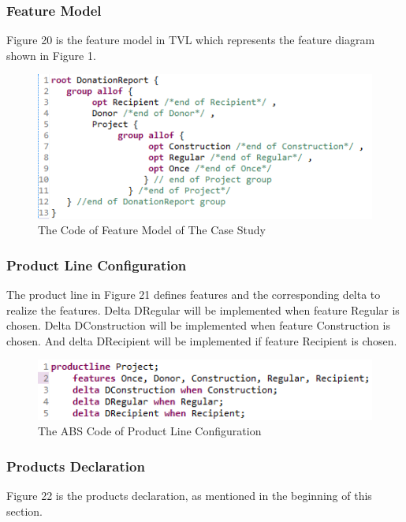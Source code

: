 \documentclass[runningheads,a4paper]{llncs}
\begin{document}
\subsubsection{Feature Model}
Figure 20 is the feature model in \textmu TVL which represents the feature diagram shown in Figure 1.

\begin{figure}
	\centering
	\includegraphics[scale=0.7]{code6.png}
	\caption{The Code of Feature Model of The Case Study}
	\label{Figure 20}
\end{figure}

\subsubsection{Product Line Configuration}
The product line in Figure 21 defines features and the corresponding delta to realize the features. Delta DRegular will be implemented when feature Regular is chosen. Delta DConstruction will be implemented when feature Construction is chosen. And delta DRecipient will be implemented if feature Recipient is chosen.

\begin{figure}
	\centering
	\includegraphics[scale=0.7]{code7.png}
	\caption{The ABS Code of Product Line Configuration}
	\label{Figure 21}
\end{figure}

\subsubsection{Products Declaration}
Figure 22 is the products declaration, as mentioned in the beginning of this section.
\end{document}
